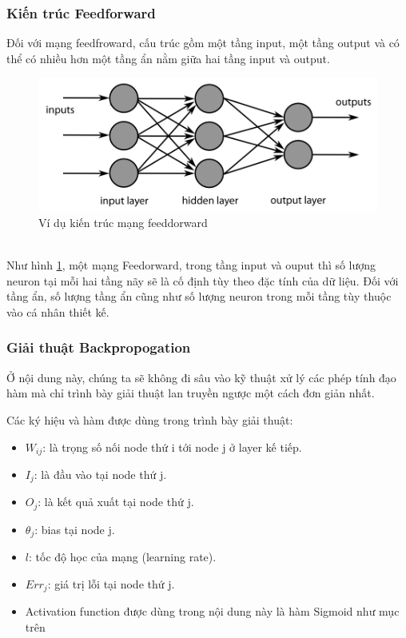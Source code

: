 		\subsubsection{Kiến trúc Feedforward}
			Đối với mạng feedfroward, cấu trúc gồm một tầng input, một tầng output và có thể có nhiều hơn một tầng ẩn nằm giữa hai tầng input và output. \\
			\begin{figure}[h!]
				\centering
				\includegraphics[scale=0.3]{charts/ffnn.png}
				\caption{Ví dụ kiến trúc mạng feeddorward}
				\label{fig:ffnn}			
			\end{figure}\\
			Như hình \ref{fig:ffnn}, một mạng Feedorward, trong tầng input và ouput thì số lượng neuron tại mỗi hai tầng nãy sẽ là cố định tùy theo đặc tính của dữ liệu. Đối với tầng ẩn, số lượng tầng ẩn cũng như số lượng neuron trong mỗi tầng tùy thuộc vào cá nhân thiết kế.
			
		\subsubsection{Giải thuật Backpropogation}
		Ở nội dung này, chúng ta sẽ không đi sâu vào kỹ thuật xử lý các phép tính\cite{dl} đạo hàm mà chỉ trình bày giải thuật lan truyền ngược một cách đơn giản nhất.\par
		Các ký hiệu và hàm được dùng trong trình bày giải thuật:
		\begin{itemize}
			\item \(W_{ij}\): là trọng số nối node thứ i tới node j ở layer kế tiếp.
			\item \(I_{j}\): là đầu vào tại node thứ j.
			\item \(O_{j}\): là kết quả xuất tại node thứ j.
			\item \(\theta_{j}\): bias tại node j.
			\item \(l\): tốc độ học của mạng (learning rate).
			\item \(Err_{j}\): giá trị lỗi tại node thứ j.
			\item Activation function được dùng trong nội dung này là hàm Sigmoid như mục trên
		\end{itemize}
		
